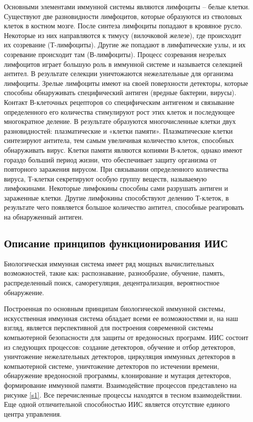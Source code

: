 \documentclass[bachelor, och, referat]{template}
\begin{document}
Основными элементами иммунной системы являются лимфоциты – белые клетки.
Существуют две разновидности лимфоцитов, которые образуются из стволовых клеток в
костном мозге. После синтеза лимфоциты попадают в кровяное русло. Некоторые из них
направляются к тимусу (вилочковой железе), где происходит их созревание (Т-лимфоциты). 
Другие же попадают в лимфатические узлы, и их созревание происходит
там (В-лимфоциты). Процесс созревания незрелых лимфоцитов играет большую роль в
иммунной системе и называется селекцией антител. В результате селекции уничтожаются 
нежелательные для организма лимфоциты. Зрелые лимфоциты имеют на своей поверхности 
детекторы, которые способны обнаруживать специфический антиген (вредные
бактерии, вирусы). Контакт В-клеточных рецепторов со специфическим антигеном и 
связывание определенного его количества стимулируют рост этих клеток и последующее 
многократное деление. В результате образуются многочисленные клетки двух разновидностей:
плазматические и «клетки памяти». Плазматические клетки синтезируют антитела, тем самым 
увеличивая количество клеток, способных обнаруживать вирус. Клетки памяти являются 
копиями В-клеток, однако имеют гораздо больший период жизни, что обеспечивает
защиту организма от повторного заражения вирусом. При связывании определенного
количества вируса, Т-клетки секретируют особую группу веществ, называемую лимфокинами. 
Некоторые лимфокины способны сами разрушать антиген и зараженные клетки.
Другие лимфокины способствуют делению Т-клеток, в результате чего появляется
большое количество антител, способные реагировать на обнаруженный антиген.

\subsection{Описание принципов функционирования ИИС}

Биологическая иммунная система имеет ряд мощных вычислительных возможностей, 
такие как: распознавание, разнообразие, обучение, память, распределенный поиск,
саморегуляция, децентрализация, вероятностное обнаружение.

Построенная по основным принципам биологической иммунной системы, 
искусственная иммунная система обладает всеми ее возможностями
и, на наш взгляд, является перспективной для построения современной
системы компьютерной безопасности для защиты от вредоносных про­грамм. 
ИИС состоит из следующих процессов: создание детекторов, обу­чение и отбор 
детекторов, уничтожение нежелательных детекторов, цир­куляция 
иммунных детекторов в компьютерной системе, уничтожение
детекторов по истечении времени, обнаружение вредоносной программы,
клонирование и мутация детекторов, формирование иммунной памяти. 
Взаимодействие процессов представлено на рисунке \ref{s1}. Все 
перечислен­ные процессы находятся в тесном взаимодействии. Еще одной 
отличи­тельной способностью ИИС является отсутствие единого центра 
управле­ния.
\end{document}
